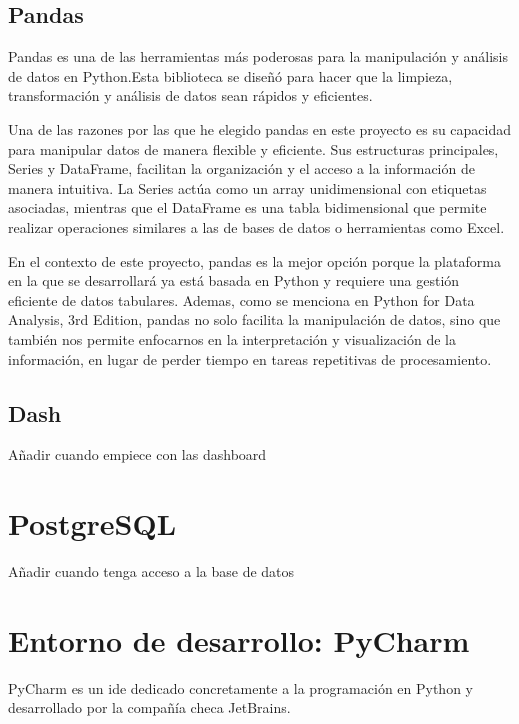 \documentclass[a4paper, 12pt]{book}
\begin{document}
\subsection{Pandas}
Pandas es una de las herramientas más poderosas para la manipulación y análisis de datos en Python.Esta biblioteca se diseñó para hacer que la limpieza, transformación y análisis de datos sean rápidos y eficientes.

Una de las razones por las que he elegido pandas en este proyecto es su capacidad para manipular datos de manera flexible y eficiente. Sus estructuras principales, Series y DataFrame, facilitan la organización y el acceso a la información de manera intuitiva.
La Series actúa como un array unidimensional con etiquetas asociadas, mientras que el DataFrame es una tabla bidimensional que permite realizar operaciones similares a las de bases de datos o herramientas como Excel.

En el contexto de este proyecto, pandas es la mejor opción porque la plataforma en la que se desarrollará ya está basada en Python y requiere una gestión eficiente de datos tabulares. Ademas, como se menciona en Python for Data Analysis, 3rd Edition, pandas no solo facilita la manipulación de datos, sino que también nos permite enfocarnos en la interpretación y visualización de la información, en lugar de perder tiempo en tareas repetitivas de procesamiento.

\subsection{Dash}
Añadir cuando empiece con las dashboard

\section{PostgreSQL}
\label{sec:PostgreSQL}
Añadir cuando tenga acceso a la base de datos

\section{Entorno de desarrollo: PyCharm}
\label{sec:entorno_de_desarrollo}


PyCharm es un \gls{ide} dedicado concretamente a la programación en Python y desarrollado por la compañía checa JetBrains.
\end{document}
